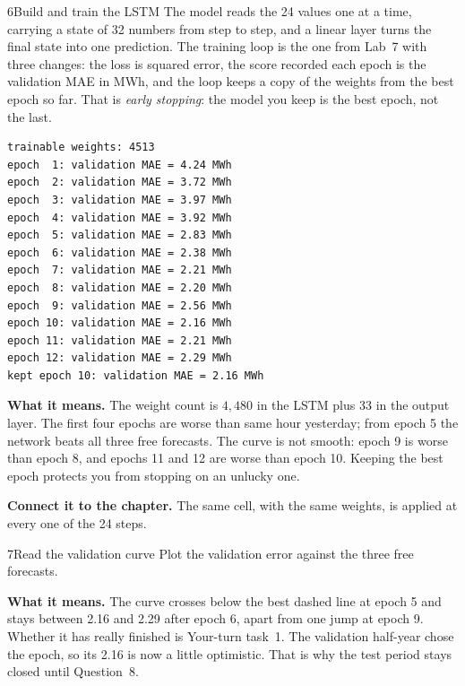
\begin{labquestion}{6}{Build and train the LSTM}
The model reads the 24 values one at a time, carrying a state of 32 numbers from step to step, and a linear layer turns the final state into one prediction. The training loop is the one from Lab~7 with three changes: the loss is squared error, the score recorded each epoch is the validation MAE in MWh, and the loop keeps a copy of the weights from the best epoch so far. That is \emph{early stopping}: the model you keep is the best epoch, not the last.
\end{labquestion}
\begin{labanswer}

\begin{refoutput}
\begin{lstlisting}[style=utpterminal]
trainable weights: 4513
epoch  1: validation MAE = 4.24 MWh
epoch  2: validation MAE = 3.72 MWh
epoch  3: validation MAE = 3.97 MWh
epoch  4: validation MAE = 3.92 MWh
epoch  5: validation MAE = 2.83 MWh
epoch  6: validation MAE = 2.38 MWh
epoch  7: validation MAE = 2.21 MWh
epoch  8: validation MAE = 2.20 MWh
epoch  9: validation MAE = 2.56 MWh
epoch 10: validation MAE = 2.16 MWh
epoch 11: validation MAE = 2.21 MWh
epoch 12: validation MAE = 2.29 MWh
kept epoch 10: validation MAE = 2.16 MWh
\end{lstlisting}
\end{refoutput}

\textbf{What it means.} The weight count is $4{,}480$ in the LSTM plus 33 in the output layer. The first four epochs are worse than same hour yesterday; from epoch 5 the network beats all three free forecasts. The curve is not smooth: epoch 9 is worse than epoch 8, and epochs 11 and 12 are worse than epoch 10. Keeping the best epoch protects you from stopping on an unlucky one.
\end{labanswer}

\textbf{Connect it to the chapter.} The same cell, with the same weights, is applied at every one of the 24 steps.


\begin{labquestion}{7}{Read the validation curve}
Plot the validation error against the three free forecasts.
\end{labquestion}
\begin{labanswer}


\textbf{What it means.} The curve crosses below the best dashed line at epoch 5 and stays between 2.16 and 2.29 after epoch 6, apart from one jump at epoch 9. Whether it has really finished is Your-turn task~1. The validation half-year chose the epoch, so its 2.16 is now a little optimistic. That is why the test period stays closed until Question~8.
\end{labanswer}

